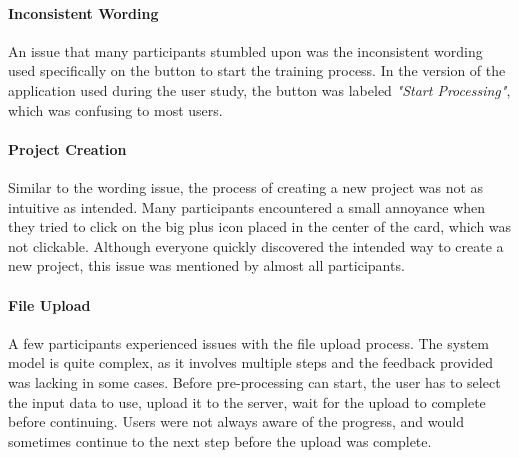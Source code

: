
\paragraph{Inconsistent Wording}
\label{sec:results:issues:inconsistent_wording}
An issue that many participants stumbled upon was the inconsistent wording used specifically on the button to start the training process.
In the version of the application used during the user study, the button was labeled \emph{"Start Processing"}, which was confusing to most users.
\cite{P2, P3, P6, P7, P8}



\paragraph{Project Creation}
Similar to the wording issue, the process of creating a new project was not as intuitive as intended.
Many participants encountered a small annoyance when they tried to click on the big plus icon placed in the center of the card, which was not clickable. 
Although everyone quickly discovered the intended way to create a new project, this issue was mentioned by almost all participants.
\cite{P3, P4, P5, P6, P7, P8}


\paragraph{File Upload}
\label{sec:results:issues:file_upload}
A few participants experienced issues with the file upload process. 
\cite{P1, P4, P6}
The system model is quite complex, as it involves multiple steps and the feedback provided was lacking in some cases.
Before pre-processing can start, the user has to select the input data to use, upload it to the server, wait for the upload to complete before continuing.
Users were not always aware of the progress, and would sometimes continue to the next step before the upload was complete. 

